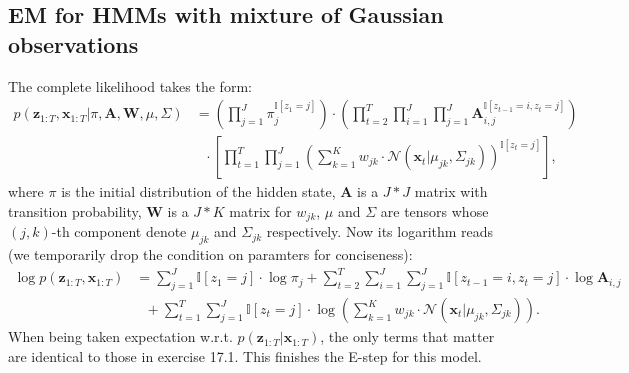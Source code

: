 \documentclass[UTF8]{ctexart}
\begin{document}
\subsection{EM for HMMs with mixture of Gaussian observations}
The complete likelihood takes the form:
$$
\begin{aligned}
p(\textbf{z}_{1:T},\textbf{x}_{1:T}|\pi,\textbf{A},\textbf{W},\mu,\Sigma)&=\left(\prod_{j=1}^{J}\pi_{j}^{\mathbb{I}[z_{1}=j]}\right)\cdot \left(\prod_{t=2}^{T}\prod_{i=1}^{J}\prod_{j=1}^{J}\textbf{A}_{i,j}^{\mathbb{I}[z_{t-1}=i,z_{t}=j]} \right)\\
&\ \ \ \cdot \left[\prod_{t=1}^{T}\prod_{j=1}^{J}\left(\sum_{k=1}^{K}w_{jk}\cdot\mathcal{N}(\textbf{x}_{t}|\mu_{jk},\Sigma_{jk}) \right)^{\mathbb{I}[z_{t}=j]} \right],
\end{aligned}
$$
where $\pi$ is the initial distribution of the hidden state, $\textbf{A}$ is a $J*J$ matrix with transition probability, $\textbf{W}$ is a $J*K$ matrix for $w_{jk}$, $\mu$ and $\Sigma$ are tensors whose $(j,k)$-th component denote $\mu_{jk}$ and $\Sigma_{jk}$ respectively.
Now its logarithm reads (we temporarily drop the condition on paramters for conciseness):
$$
\begin{aligned}
\log p(\textbf{z}_{1:T},\textbf{x}_{1:T})&=\sum_{j=1}^{J}\mathbb{I}[z_{1}=j]\cdot \log \pi_{j}+\sum_{t=2}^{T}\sum_{i=1}^{J}\sum_{j=1}^{J}\mathbb{I}[z_{t-1}=i,z_{t}=j]\cdot\log \textbf{A}_{i,j} \\
&\ \ \ +\sum_{t=1}^{T}\sum_{j=1}^{J}\mathbb{I}[z_{t}=j]\cdot\log \left(\sum_{k=1}^{K}w_{jk}\cdot\mathcal{N}(\textbf{x}_{t}|\mu_{jk},\Sigma_{jk}) \right).
\end{aligned}
$$
When being taken expectation w.r.t. $p(\textbf{z}_{1:T}|\textbf{x}_{1:T})$, the only terms that matter are identical to those in exercise 17.1.
This finishes the E-step for this model. 
\end{document}
